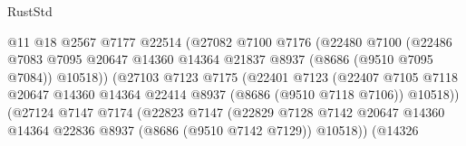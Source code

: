 \begin{lexlean}{RustStd}
\begin{coremodule}
                                      @11
                                      @18
                                      @2567
                                      @7177
                                      @22514
                                      (@27082
                                        @7100
                                        @7176
                                        (@22480
                                          @7100
                                          (@22486
                                            @7083
                                            @7095
                                            @20647
                                            @14360
                                            @14364
                                            @21837
                                            @8937
                                            (@8686 (@9510 @7095 @7084))
                                            @10518))
                                        (@27103
                                          @7123
                                          @7175
                                          (@22401
                                            @7123
                                            (@22407
                                              @7105
                                              @7118
                                              @20647
                                              @14360
                                              @14364
                                              @22414
                                              @8937
                                              (@8686 (@9510 @7118 @7106))
                                              @10518))
                                          (@27124
                                            @7147
                                            @7174
                                            (@22823
                                              @7147
                                              (@22829
                                                @7128
                                                @7142
                                                @20647
                                                @14360
                                                @14364
                                                @22836
                                                @8937
                                                (@8686 (@9510 @7142 @7129))
                                                @10518))
                                            (@14326

\end{coremodule}
\end{lexlean}
